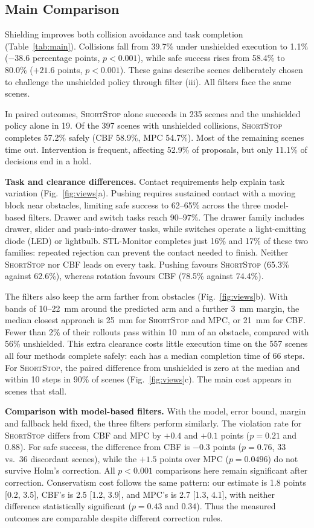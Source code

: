 \documentclass[runningheads]{llncs}
\newcommand{\sys}{\textsc{ShortStop}}
\begin{document}
\subsection{Main Comparison}
Shielding improves both collision avoidance and task completion
(Table~\ref{tab:main}). Collisions fall from 39.7\% under unshielded
execution to 1.1\% ($-38.6$ percentage points, $p<0.001$), while safe
success rises from 58.4\% to 80.0\% ($+21.6$ points, $p<0.001$).
These gains describe scenes deliberately chosen to challenge the
unshielded policy through filter (iii). All filters face the same scenes.

In paired outcomes, \sys{} alone succeeds in 235 scenes and the
unshielded policy alone in 19. Of the 397 scenes with unshielded collisions, \sys{} completes
57.2\% safely (CBF 58.9\%, MPC 54.7\%). Most of the remaining scenes
time out. Intervention is frequent, affecting 52.9\% of proposals,
but only 11.1\% of decisions end in a hold.

\textbf{Task and clearance differences.} Contact requirements help explain
task variation (Fig.~\ref{fig:views}a). Pushing requires sustained contact
with a moving block near obstacles, limiting safe success to 62--65\%
across the three model-based filters. Drawer and switch
tasks reach 90--97\%. The drawer family includes drawer, slider and
push-into-drawer tasks, while switches operate a light-emitting diode
(LED) or lightbulb. STL-Monitor completes just 16\% and 17\% of these
two families: repeated rejection can prevent the contact needed to finish.
Neither \sys{} nor CBF leads on every task. Pushing favours \sys{}
(65.3\% against 62.6\%), whereas rotation favours CBF (78.5\% against 74.4\%).

The filters also keep the arm farther from obstacles
(Fig.~\ref{fig:views}b). With bands of 10--22~mm around the predicted arm
and a further 3~mm margin, the median closest approach is 25~mm for
\sys{} and MPC, or 21~mm for CBF. Fewer than 2\% of their rollouts
pass within 10~mm of an obstacle, compared with 56\% unshielded.
This extra clearance costs little execution time on the 557 scenes all
four methods complete safely: each has a median completion time of
66 steps. For \sys{}, the paired difference from unshielded is zero
at the median and within 10 steps in 90\% of scenes
(Fig.~\ref{fig:views}c). The main cost appears in scenes that stall.

\textbf{Comparison with model-based filters.} With the model, error bound,
margin and fallback held fixed, the three filters perform similarly.
The violation rate for \sys{} differs from CBF and MPC by $+0.4$ and $+0.1$ points
($p=0.21$ and $0.88$). For safe success, the difference from CBF is
$-0.3$ points ($p=0.76$, 33 vs.\ 36 discordant scenes), while the
$+1.5$ points over MPC ($p=0.0496$) do not survive Holm's correction.
All $p<0.001$ comparisons here remain significant after correction.
Conservatism cost follows the same pattern: our estimate is 1.8 points
[0.2, 3.5], CBF's is 2.5 [1.2, 3.9], and MPC's is 2.7 [1.3, 4.1],
with neither difference statistically significant ($p=0.43$ and $0.34$).
Thus the measured outcomes are comparable despite different correction rules.
\end{document}
